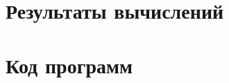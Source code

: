 \newpage
\section{ Результаты вычислений}
\label{c:app_results}




\newpage
\section{ Код программ}
\label{c:listings}
\renewcommand{\thelstlisting}{D.1}

\renewcommand{\thelstlisting}{D.2}

\renewcommand{\thelstlisting}{D.3}
